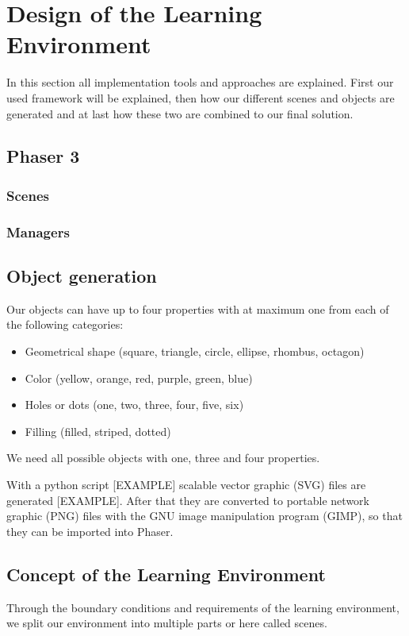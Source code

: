 
\chapter{Design of the Learning Environment}
\label{chap:design}

In this section all implementation tools and approaches are explained.
First our used framework will be explained, then how our different scenes and objects are generated and
at last how these two are combined to our final solution.

\section{Phaser 3}

\subsection{Scenes}
\subsection{Managers}
\section{Object generation}
Our objects can have up to four properties with at maximum one from each of the following categories:
\begin{itemize}
    \item Geometrical shape (square, triangle, circle, ellipse, rhombus, octagon)
    \item Color (yellow, orange, red, purple, green, blue)
    \item Holes or dots (one, two, three, four, five, six)
    \item Filling (filled, striped, dotted)
\end{itemize}

We need all possible objects with one, three and four properties.

With a python script [EXAMPLE] scalable vector graphic (SVG) files are generated [EXAMPLE].
After that they are converted to portable network graphic (PNG) files with the GNU image manipulation program (GIMP),
so that they can be imported into Phaser.

\section{Concept of the Learning Environment}
Through the boundary conditions and requirements of the learning environment,
we split our environment into multiple parts or here called scenes.

